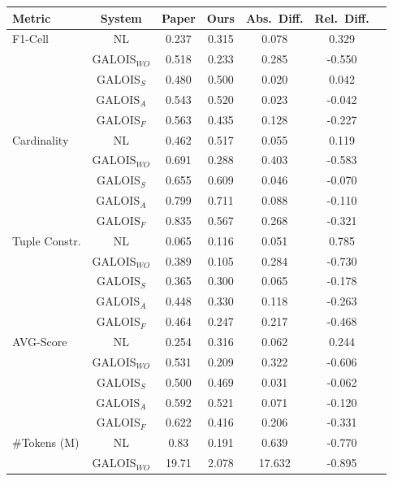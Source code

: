 \documentclass[11pt]{article}
\begin{document}
\begin{table}[htbp]
\centering
\label{tab:diff_my_vs_paper}
\begin{tabular}{lcccccc}
\hline
Metric & System & Paper & Ours & Abs.\ Diff. & Rel.\ Diff. \\
\hline
F1-Cell & NL            & 0.237 & 0.315   & 0.078   & 0.329 \\
        & GALOIS$_{WO}$ & 0.518 & 0.233   & 0.285   & -0.550 \\
        & GALOIS$_S$    & 0.480 & 0.500   & 0.020   & 0.042 \\
        & GALOIS$_A$    & 0.543 & 0.520   & 0.023   & -0.042 \\
        & GALOIS$_F$    & 0.563 & 0.435   & 0.128   & -0.227 \\
\hline
Cardinality & NL            & 0.462 & 0.517   & 0.055   & 0.119 \\
            & GALOIS$_{WO}$ & 0.691 & 0.288   & 0.403   & -0.583 \\
            & GALOIS$_S$    & 0.655 & 0.609   & 0.046   & -0.070 \\
            & GALOIS$_A$    & 0.799 & 0.711   & 0.088   & -0.110 \\
            & GALOIS$_F$    & 0.835 & 0.567   & 0.268   & -0.321 \\
\hline
Tuple Constr. & NL            & 0.065 & 0.116   & 0.051   & 0.785 \\
              & GALOIS$_{WO}$ & 0.389 & 0.105   & 0.284   & -0.730 \\
              & GALOIS$_S$    & 0.365 & 0.300   & 0.065   & -0.178 \\
              & GALOIS$_A$    & 0.448 & 0.330   & 0.118   & -0.263 \\
              & GALOIS$_F$    & 0.464 & 0.247   & 0.217   & -0.468 \\
\hline
AVG-Score & NL            & 0.254 & 0.316   & 0.062   & 0.244 \\
          & GALOIS$_{WO}$ & 0.531 & 0.209   & 0.322   & -0.606 \\
          & GALOIS$_S$    & 0.500 & 0.469   & 0.031   & -0.062 \\
          & GALOIS$_A$    & 0.592 & 0.521   & 0.071   & -0.120 \\
          & GALOIS$_F$    & 0.622 & 0.416   & 0.206   & -0.331 \\
\hline
\#Tokens (M) & NL            & 0.83  & 0.191   & 0.639   & -0.770 \\
             & GALOIS$_{WO}$ & 19.71 & 2.078   & 17.632  & -0.895 \\

\end{tabular}
\end{table}
\end{document}
